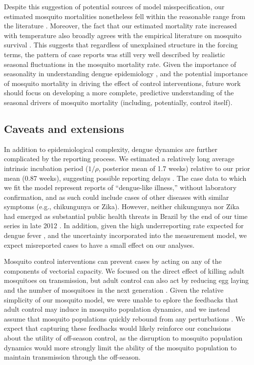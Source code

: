 \documentclass[10pt,letterpaper]{article}
\begin{document}
Despite this suggestion of potential sources of model misspecification, our estimated mosquito mortalities nonetheless fell within the reasonable range from the literature \cite{Maciel-de-Freitas2008, Brady2013}.
Moreover, the fact that our estimated mortality rate increased with temperature also broadly agrees with the empirical literature on mosquito survival \cite{Yang2009, Brady2013, Morin2013}.
This suggests that regardless of unexplained structure in the forcing terms, the pattern of case reports was still very well described by realistic seasonal fluctuations in the mosquito mortality rate.
Given the importance of seasonality in understanding dengue epidemiology \cite{TenBosch2016}, and the potential importance of mosquito mortality in driving the effect of control interventions, future work should focus on developing a more complete, predictive understanding of the seasonal drivers of mosquito mortality (including, potentially, control itself).

\subsection*{Caveats and extensions}

In addition to epidemiological complexity, dengue dynamics are further complicated by the reporting process.
We estimated a relatively long average intrinsic incubation period ($1/\rho$, posterior mean of 1.7 weeks) relative to our prior mean (0.87 weeks), suggesting possible reporting delays \cite{Reich2016}.
The case data to which we fit the model represent reports of ``dengue-like illness,'' without laboratory confirmation, and as such could include cases of other diseases with similar symptoms (e.g., chikungunya or Zika).
However, neither chikungunya nor Zika had emerged as substantial public health threats in Brazil by the end of our time series in late 2012 \cite{PAHO2014, PAHO2015}.
In addition, given the high underreporting rate expected for dengue fever \cite{Silva2016}, and the uncertainty incorporated into the measurement model, we expect misreported cases to have a small effect on our analyses.

Mosquito control interventions can prevent cases by acting on any of the components of vectorial capacity.
We focused on the direct effect of killing adult mosquitoes on transmission, but adult control can also act by reducing egg laying and the number of mosquitoes in the next generation \cite{Brady2016}.
Given the relative simplicity of our mosquito model, we were unable to eplore the feedbacks that adult control may induce in mosquito population dynamics, and we instead assume that mosquito populations quickly rebound from any perturbations \cite{Focks1987}.
We expect that capturing these feedbacks would likely reinforce our conclusions about the utility of off-season control, as the disruption to mosquito population dynamics would more strongly limit the ability of the mosquito population to maintain transmission through the off-season.
\end{document}
